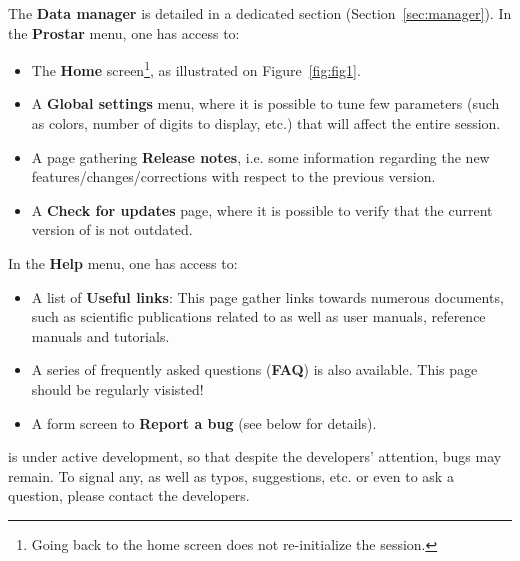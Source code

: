 \documentclass[12pt]{article}
\begin{document}
The \textbf{Data manager} is detailed in a dedicated section (Section~\ref{sec:manager}).  
In the \textbf{Prostar} menu, one has access to:
\begin{itemize}
	\item The \textbf{Home} screen\footnote{Going back to the home screen does not re-initialize the session.}, as illustrated on Figure~\ref{fig:fig1}.
	\item A \textbf{Global settings} menu, where it is possible to tune few parameters (such as colors, number of digits to display, etc.) that will affect the entire session.
	\item A page gathering \textbf{Release notes}, i.e. some information regarding the new features/changes/corrections with respect to the previous version.
	\item A \textbf{Check for updates} page, where it is possible to verify that the current version of  is not outdated.
\end{itemize}


In the \textbf{Help} menu, one has access to:
\begin{itemize}
	\item A list of \textbf{Useful links}: This page gather links towards numerous documents, such as scientific publications related to  as well as user manuals, reference manuals and tutorials.
	\item A series of frequently asked questions (\textbf{FAQ}) is also available. This page should be regularly visisted! %
	\item A form screen to \textbf{Report a bug} (see below for details).
\end{itemize}

 is under active 
development, so that despite the developers' attention, bugs may remain. 
To signal any, as well as typos, suggestions, etc. or even to ask a question, 
please contact the developers. 
\end{document}
